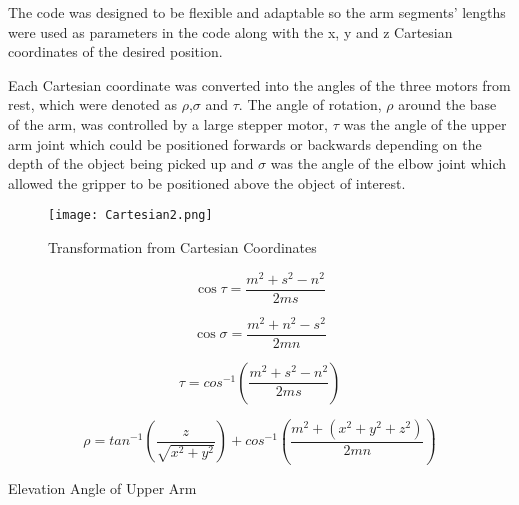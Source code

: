 The code was designed to be flexible and adaptable so the arm segments’ lengths were used as parameters in the code along with the x, y and z Cartesian coordinates of the desired position.  

Each Cartesian coordinate was converted into the angles of the three motors from rest, which were denoted as $\rho$,$\sigma$ and $\tau$.  The angle of rotation, $\rho$ around the base of the arm, was controlled by a large stepper motor, $\tau$ was the angle of the upper arm joint which could be positioned forwards or backwards depending on the depth of the object being picked up and $\sigma$ was the angle of the elbow joint which allowed the gripper to be positioned above the object of interest.  

\begin{figure}[!htb]
\begin{center}
\texttt{[image: Cartesian2.png]}
\end{center}
\caption{Transformation from Cartesian Coordinates}
\label{fig:cartesian}
\end{figure}

\begin{capequ}[!htb]
\begin{center}
\begin{equation}
\cos \tau = \frac{m^{2}+s^{2}-n^{2}}{2ms}
\end{equation}
\label{Equation1}
\end{center}
\end{capequ}

\begin{capequ}[!htb]
\begin{center}
\begin{equation}
\cos \sigma  = \frac{m^{2}+n^{2}-s^{2}}{2mn}
\end{equation}
\label{Equation2}
\end{center}
\end{capequ}

\begin{capequ}[!htb]
\begin{center}
\begin{equation}
\tau = cos^{-1}\left (\frac{m^{2}+s^{2}-n^{2}}{2ms}\right )
\end{equation}
\caption{}
\label{Equation6}
\end{center}
\end{capequ}

\begin{capequ}[!htb]
\begin{center}
\begin{equation}
\rho = tan^{-1}\left ( \frac{z}{\sqrt{{x^{2}+y^{2}}}} \right )+ cos^{-1}\left ( \frac{m^{2}+(x^{2}+y^{2}+z^{2})}{2mn} \right )
\end{equation}
\caption{Elevation Angle of Upper Arm}
\label{Equation3}
\end{center}
\end{capequ}


